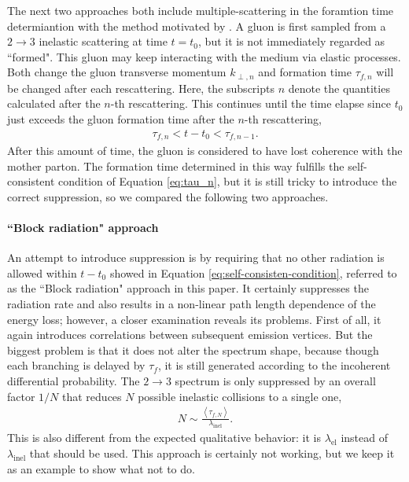 \documentclass[aps, prc, reprint, amsmath, groupedaddress, nofootinbib]{revtex4-1}
\begin{document}
The next two approaches both include multiple-scattering in the foramtion time determiantion with the method motivated by \cite{Zapp:2011ya}.
A gluon is first sampled from a $2\rightarrow3$ inelastic scattering at time $t=t_0$, but it is not immediately regarded as ``formed". 
This gluon may keep interacting with the medium via elastic processes. Both change the gluon transverse momentum $k_{\perp,n}$ and formation time $\tau_{f,n}$ will be changed after each rescattering.
Here, the subscripts $n$ denote the quantities calculated after the $n$-th rescattering.
This continues until the time elapse since $t_0$ just exceeds the gluon formation time after the $n$-th rescattering,
\begin{eqnarray}\label{eq:self-consisten-condition}
\tau_{f, n} < t-t_0 < \tau_{f, n-1}.
\end{eqnarray}
After this amount of time, the gluon is considered to have lost coherence with the mother parton.
The formation time determined in this way fulfills the self-consistent condition of Equation \ref{eq:tau_n}, but it is still tricky to introduce the correct suppression, so we compared the following two approaches. 

\paragraph*{``Block radiation" approach}
An attempt to introduce suppression is by requiring that no other radiation is allowed within $t-t_0$ showed in Equation \ref{eq:self-consisten-condition}, referred to as the ``Block radiation" approach in this paper.
It certainly suppresses the radiation rate and also results in a non-linear path length dependence of the energy loss; however, a closer examination reveals its problems.
First of all, it again introduces correlations between subsequent emission vertices.
But the biggest problem is that it does not alter the spectrum shape, because though each branching is delayed by $\tau_f$, it is still generated according to the incoherent differential probability. 
The $2\rightarrow 3$ spectrum is only suppressed by an overall factor $1/N$ that reduces $N$ possible inelastic collisions to a single one,
\begin{eqnarray}
N \sim \frac{\left\langle\tau_{f,N}\right\rangle}{ \lambda_{\textrm{inel}}}.
\end{eqnarray}
This is also different from the expected qualitative behavior: it is  $\lambda_{\textrm{el}}$ instead of $\lambda_{\textrm{inel}}$ that should be used.
This approach is certainly not working, but we keep it as an example to show what not to do.
\end{document}
